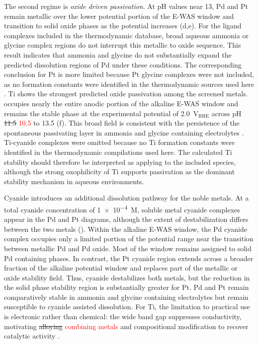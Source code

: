 \documentclass[twoside,twocolumn,9pt]{article}
\begin{document}
The second regime is \emph{oxide driven passivation}. At pH values near 13, Pd and Pt remain metallic over the lower potential portion of the E-WAS window and transition to solid oxide phases as the potential increases (d,e). For the ligand complexes included in the thermodynamic database, broad aqueous ammonia or glycine complex regions do not interrupt this metallic to oxide sequence. This result indicates that ammonia and glycine do not substantially expand the predicted dissolution regions of Pd under these conditions. The corresponding conclusion for Pt is more limited because Pt glycine complexes were not included, as no formation constants were identified in the thermodynamic sources used here \cite{Smith1989CriticalConstants}. Ti shows the strongest predicted oxide passivation among the screened metals.  occupies nearly the entire anodic portion of the alkaline E-WAS window and remains the stable phase at the experimental potential of 2.0~V$_{\mathrm{RHE}}$ across pH \sout{11.5} \textcolor{red}{10.5} to 13.5 (f). This broad  field is consistent with the persistence of the spontaneous passivating layer in ammonia and glycine containing electrolytes \cite{Kiss1991CriticalGlycine,Knauss2001TiIV300C,Schmidt2006DissolutionEffect,Pocsi1988ComplexAcid}. Ti-cyanide complexes were omitted because no Ti  formation constants were identified in the thermodynamic compilations used here. The calculated Ti stability should therefore be interpreted as applying to the included species, although the strong oxophilicity of Ti supports  passivation as the dominant stability mechanism in aqueous environments.



Cyanide introduces an additional dissolution pathway for the noble metals. At a total cyanide concentration of \SI{1e-4}{M}, soluble metal cyanide complexes appear in the Pd and Pt diagrams, although the extent of destabilization differs between the two metals (). Within the alkaline E-WAS window, the Pd cyanide complex occupies only a limited portion of the potential range near the transition between metallic Pd and Pd oxide. Most of the window remains assigned to solid Pd containing phases. In contrast, the Pt cyanide region extends across a broader fraction of the alkaline potential window and replaces part of the metallic or oxide stability field. Thus, cyanide destabilizes both metals, but the reduction in the solid phase stability region is substantially greater for Pt. Pd and Pt remain comparatively stable in ammonia and glycine containing electrolytes but remain susceptible to cyanide assisted dissolution. For Ti, the limitation to practical use is electronic rather than chemical: the wide  band gap suppresses conductivity, motivating \sout{alloying} \textcolor{red}{combining metals} and compositional modification to recover catalytic activity \cite{Gardon2013ImprovedSpray,Hui2022VacancyBatteries}.
\end{document}
